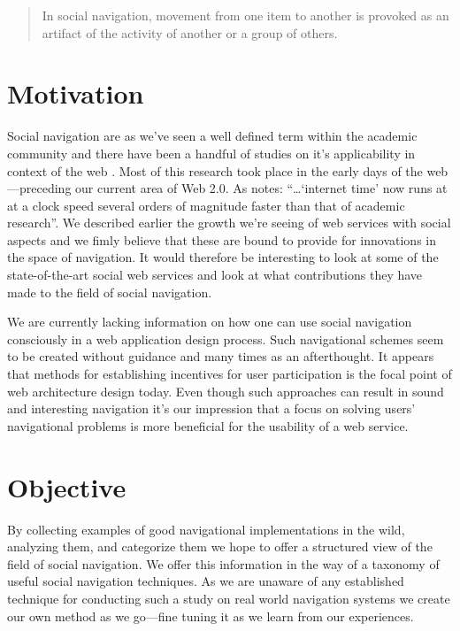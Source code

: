 \begin{quote}
In social navigation, movement from one item to another is provoked as an
artifact of the activity of another or a group of others. \citep{dourish94} 
\end{quote}

\section{Motivation}

Social navigation are as we've seen a well defined term within the academic
community and there have been a handful of studies on it's applicability in
context of the web \citep{dieberger97,wexelblat99}. %
Most of this research took place in the early days of the
web---preceding our current area of Web 2.0.
As \citet{beer07} notes: ``\ldots `internet time' now runs at at a clock speed
several orders of magnitude faster than that of academic research''.
We described earlier the
growth we're seeing of web services with social aspects and
we fimly believe that these are bound to provide
for innovations in the space of navigation. It would therefore be interesting
to look at some of the state-of-the-art social web services and look at what
contributions they have made to the field of social navigation.

We are currently lacking information on how one can use social navigation
consciously in a web application design process. Such navigational schemes
seem to be created without guidance and many times as an afterthought.
It appears that methods for establishing incentives for user participation
is the focal point of web architecture design today. Even though such
approaches can result in sound and interesting navigation it's our impression
that a focus on solving users' navigational problems is more beneficial for
the usability of a web service.

\section{Objective}

By collecting examples of good navigational implementations in the wild,
analyzing them, and categorize them we hope to offer a structured view of the
field of social navigation. We offer this information in the way of a taxonomy
of useful social navigation techniques.
As we are unaware of any established technique for
conducting such a study on real world navigation systems we create our own
method as we go---fine tuning it as we learn from our experiences.

